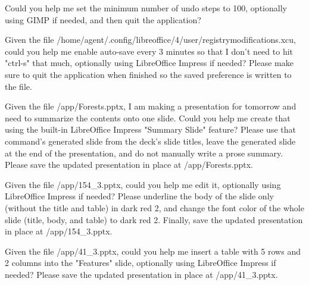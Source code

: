 \begin{instructionbox}
Could you help me set the minimum number of undo steps to 100, optionally using GIMP if needed, and then quit the application?
\end{instructionbox}

\begin{instructionbox}
Given the file \textasciigrave{}/home/agent/.config/libreoffice/4/user/registrymodifications.xcu\textasciigrave{}, could you help me enable auto-save every 3 minutes so that I don't need to hit "ctrl-s" that much, optionally using LibreOffice Impress if needed? Please make sure to quit the application when finished so the saved preference is written to the file.
\end{instructionbox}

\begin{instructionbox}
Given the file \textasciigrave{}/app/Forests.pptx\textasciigrave{}, I am making a presentation for tomorrow and need to summarize the contents onto one slide. Could you help me create that using the built-in LibreOffice Impress "Summary Slide" feature? Please use that command's generated slide from the deck's slide titles, leave the generated slide at the end of the presentation, and do not manually write a prose summary. Please save the updated presentation in place at \textasciigrave{}/app/Forests.pptx\textasciigrave{}.
\end{instructionbox}

\begin{instructionbox}
Given the file \textasciigrave{}/app/154\_3.pptx\textasciigrave{}, could you help me edit it, optionally using LibreOffice Impress if needed? Please underline the body of the slide only (without the title and table) in dark red 2, and change the font color of the whole slide (title, body, and table) to dark red 2. Finally, save the updated presentation in place at \textasciigrave{}/app/154\_3.pptx\textasciigrave{}.
\end{instructionbox}

\begin{instructionbox}
Given the file \textasciigrave{}/app/41\_3.pptx\textasciigrave{}, could you help me insert a table with 5 rows and 2 columns into the "Features" slide, optionally using LibreOffice Impress if needed? Please save the updated presentation in place at \textasciigrave{}/app/41\_3.pptx\textasciigrave{}.
\end{instructionbox}

